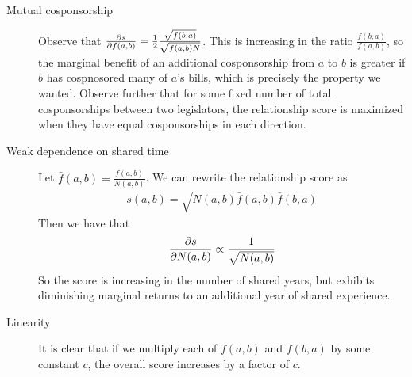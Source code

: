 \documentclass{article}
\begin{document}
\begin{description}
    \item[Mutual cosponsorship] Observe that $\frac{\partial s}{\partial f(a, b)} = \frac{1}{2} \frac{\sqrt{f(b, a)}}{\sqrt{f(a, b) N}}$. This is increasing in the ratio $\frac{f(b, a)}{f(a, b)}$, so the marginal benefit of an additional cosponsorship from $a$ to $b$ is greater if $b$ has cospnosored many of $a$'s bills, which is precisely the property we wanted. Observe further that for some fixed number of total cosponsorships between two legislators, the relationship score is maximized when they have equal cosponsorships in each direction. 
    \item[Weak dependence on shared time] Let $\bar{f}(a, b) = \frac{f(a, b)}{N(a, b)}$. We can rewrite the relationship score as
    \begin{align*}
        s(a, b) = \sqrt{N(a, b) \bar{f}(a, b) \bar{f}(b, a)}
    \end{align*} 
    Then we have that
    \begin{align*}
        \frac{\partial s}{\partial N(a, b)} \propto \frac{1}{\sqrt{N(a, b)}}
    \end{align*} 
    So the score is increasing in the number of shared years, but exhibits diminishing marginal returns to an additional year of shared experience. 
    \item[Linearity] It is clear that if we multiply each of $f(a, b)$ and $f(b, a)$ by some constant $c$, the overall score increases by a factor of $c$. 
\end{description}
\end{document}
